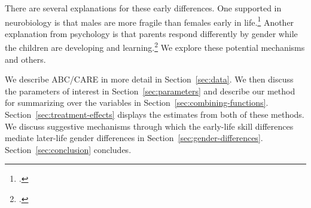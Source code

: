 There are several explanations for these early differences. One supported in neurobiology is that males are more fragile than females early in life.\footnote{\citet{}.} Another explanation from psychology is that parents respond differently by gender while the children are developing and learning.\footnote{\citet{}.} We explore these potential mechanisms and others.

We describe ABC/CARE in more detail in Section~\ref{sec:data}. We then discuss the parameters of interest in Section~\ref{sec:parameters} and describe our method for summarizing over the variables in Section~\ref{sec:combining-functions}. Section~\ref{sec:treatment-effects} displays the estimates from both of these methods. We discuss suggestive mechanisms through which the early-life skill differences mediate later-life gender differences in Section~\ref{sec:gender-differences}. Section~\ref{sec:conclusion} concludes.


